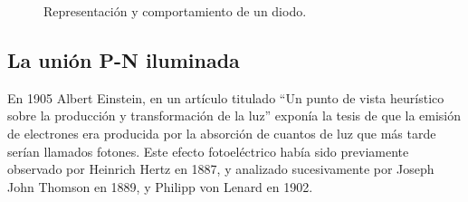 %
\begin{figure}


\caption{Representación y comportamiento de un diodo.}

\end{figure}



\subsection{La unión P-N iluminada}

\nocite{Wenham.Green.ea2000,Lorenzo2006c}

En 1905 Albert Einstein, en un artículo titulado {}``Un punto de
vista heurístico sobre la producción y transformación de la luz''
exponía la tesis de que la emisión de electrones era producida por
la absorción de cuantos de luz que más tarde serían llamados fotones.
Este efecto fotoeléctrico había sido previamente observado por Heinrich
Hertz en 1887, y analizado sucesivamente por Joseph John Thomson en
1889, y Philipp von Lenard en 1902. 

